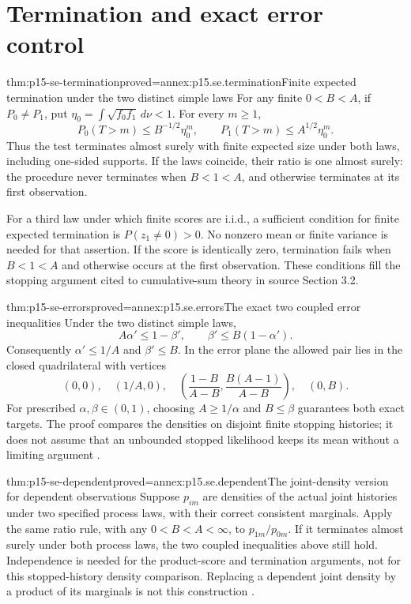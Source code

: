 \section{Termination and exact error control}
\label{sec:p15-se-error-control}

\begin{hbtheorem}{thm:p15-se-termination}{proved=annex:p15.se.termination}{Finite expected termination under the two distinct simple laws}
For any finite \(0<B<A\), if \(P_0\ne P_1\), put
\(\eta_0=\int\sqrt{f_0f_1}\,d\nu<1\).
For every \(m\geq1\),
\[
 P_0(T>m)\leq B^{-1/2}\eta_0^m,\qquad
 P_1(T>m)\leq A^{1/2}\eta_0^m.
\]
Thus the test terminates almost surely with finite expected size under
both laws, including one-sided supports. If the laws coincide, their
ratio is one almost surely: the procedure never terminates when
\(B<1<A\), and otherwise terminates at its first observation.

For a third law under which finite scores are i.i.d., a sufficient
condition for finite expected termination is \(P(z_1\ne0)>0\).
No nonzero mean or finite variance is needed for that assertion. If the
score is identically zero, termination fails when \(B<1<A\) and
otherwise occurs at the first observation. These conditions fill
the stopping argument cited to cumulative-sum theory in source Section 3.2.
\end{hbtheorem}

\begin{hbtheorem}{thm:p15-se-errors}{proved=annex:p15.se.errors}{The exact two coupled error inequalities}
Under the two distinct simple laws,
\[
       A\alpha'\leq1-\beta',\qquad
       \beta'\leq B(1-\alpha').
\]
Consequently \(\alpha'\leq1/A\) and \(\beta'\leq B\).
In the error plane the allowed pair lies in the closed quadrilateral
with vertices
\[
 (0,0),\quad(1/A,0),\quad
 \left(\frac{1-B}{A-B},\frac{B(A-1)}{A-B}\right),\quad(0,B).
\]
For prescribed \(\alpha,\beta\in(0,1)\), choosing
\(A\geq1/\alpha\) and \(B\leq\beta\) guarantees both exact
targets. The proof compares the densities on disjoint finite stopping
histories; it does not assume that an unbounded stopped likelihood keeps
its mean without a limiting argument
\cite[Section 3.2, equations (3.16)--(3.21)]{Wald1945SequentialTests}.
\end{hbtheorem}

\begin{hbtheorem}{thm:p15-se-dependent}{proved=annex:p15.se.dependent}{The joint-density version for dependent observations}
Suppose \(p_{im}\) are densities of the actual joint histories under
two specified process laws, with their correct consistent marginals.
Apply the same ratio rule, with any \(0<B<A<\infty\), to
\(p_{1m}/p_{0m}\). If it terminates
almost surely under both process laws, the two coupled inequalities
above still hold. Independence is needed for the product-score and
termination arguments, not for this stopped-history density comparison.
Replacing a dependent joint density by a product of its marginals is
not this construction \cite[p.~130]{Wald1945SequentialTests}.
\end{hbtheorem}

